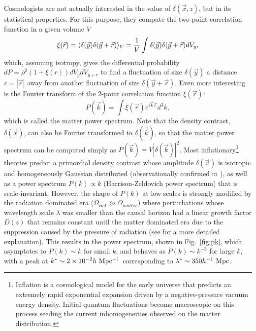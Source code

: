 Cosmologists are not actually interested in the value of $\delta(\vec{x},z)$, but in its statistical properties. For this purpose, they compute the two-point correlation function in a given volume $V$
\begin{equation}
\xi(\vec{r}) = \langle \delta(\vec{y}) \delta(\vec{y}+\vec{r}) \rangle_V = {1 \over V}\int \delta(\vec{y})\delta(\vec{y}+\vec{r})dV_y,
\end{equation}
which, assuming isotropy, gives the differential probability $dP = \bar{\rho}^2(1+\xi(r))dV_ydV_{y+r}$ to find a fluctuation of size $\delta (\vec{y})$ a distance $r=|\vec{r}|$ away from another fluctuation of size $\delta (\vec{y}+\vec{r})$. Even more interesting is the Fourier transform of the 2-point correlation function $\xi(\vec{r})$:
\begin{equation}
P(\vec{k}) = \int \xi(\vec{r})e^{i\vec{k}\vec{r}}d^3k,
\end{equation}
which is called the matter power spectrum. Note that the density contrast, $\delta({\vec{x}})$, can also be Fourier transformed to $\delta({\vec{k}})$, so that the matter power spectrum can be computed simply as $P(\vec{k})=V|\delta(\vec{k})|^2$. Most inflationary\footnote{Inflation is a cosmological model for the early universe that predicts an extremely rapid exponential expansion driven by a negative-pressure vacuum energy density. Initial quantum fluctuations become macroscopic on this process seeding the current inhomogeneities observed on the matter distribution.} theories predict a primordial density contrast whose amplitude $\delta(\vec{r})$ is isotropic and homogeneously Gaussian distributed (observationally confirmed in \citet{komatsu2009}), as well as a power spectrum $P(k) \propto k$ (Harrison-Zeldovich power spectrum) that is scale-invariant. However, the shape of $P(k)$ at low scales is strongly modified by the radiation dominated era ($\Omega_{rad} \gg \Omega_{matter}$) where perturbations whose wavelength scale $\lambda$ was smaller than the causal horizon had a linear growth factor $D(z)$ that remains constant until the matter dominated era due to the suppression caused by the pressure of radiation (see \cite{Dodelson2003} for a more detailed explanation). This results in the power spectrum, shown in Fig.~\ref{fig:pk}, which asymptotes to $P(k)\sim k$ for small $k$, and behaves as $P(k)\sim k^{-3}$ for large $k$, with a peak at $k^\ast \sim 2 \times 10^{-2} h\ \rm Mpc^{-1}$ corresponding to $\lambda^\ast\sim 350 h^{-1}\ \rm Mpc$.
